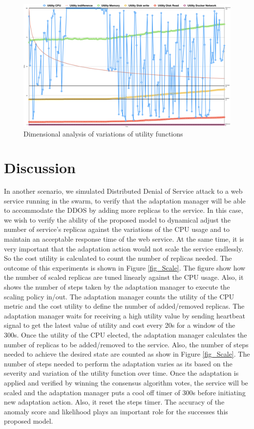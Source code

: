 \documentclass[sigconf]{acmart}
\begin{document}
\begin{figure}[ht!] 
\includegraphics[scale=0.3]{demand}
\caption{ Dimensional analysis of variations of utility functions}
\label{fig_demand}
\end{figure}
 \section{Discussion}
\label{sec:disc}

In another scenario, we simulated Distributed Denial of Service attack to a web service running in the swarm, to verify that the adaptation manager will be able to accommodate the DDOS by adding more replicas to the service. In this case, we wish to verify the ability of the proposed model to dynamical adjust the number of service's replicas against the variations of the CPU usage and to maintain an acceptable response time of the web service. At the same time, it is very important that the adaptation action would not scale the service endlessly. So the cost utility is calculated to count the number of replicas needed. The outcome of this experiments is shown in Figure \ref{fig_Scale}. The figure show how the number of scaled replicas are tuned linearly against the CPU usage. Also, it shows the number of steps taken by the adaptation manager to execute the scaling policy in/out. The adaptation manager counts the utility of the CPU metric and the cost utility to define the number of added/removed replicas. The adaptation manager waits for receiving a high utility value by sending heartbeat signal to get the latest value of utility and cost every 20s for a window of the 300s. Once the utility of the CPU elected, the adaptation manager calculates the number of replicas to be added/removed to the service. Also, the number of steps needed to achieve the desired state are counted as show in Figure \ref{fig_Scale}. The number of steps needed to perform the adaptation varies as its based on the severity and variation of the utility function over time. Once the adaptation is applied and verified by winning the consensus algorithm votes, the service will be scaled and the adaptation manager puts a cool off timer of 300s before initiating new adaptation action. Also, it reset the steps timer. The accuracy of the anomaly score and likelihood plays an important role for the successes this proposed model. 
\end{document}
